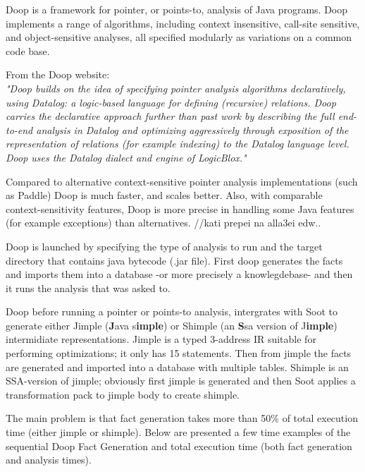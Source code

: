 \documentclass{dithesis}
\begin{document}
    Doop is a framework for pointer, or points-to, analysis of Java programs. Doop implements a range of algorithms, including context insensitive, call-site sensitive, and object-sensitive analyses, all specified modularly as variations on a common code base.

	From the Doop website: \\
    \textit{"Doop builds on the idea of specifying pointer analysis algorithms declaratively, using Datalog: a logic-based language for defining (recursive) relations. Doop carries the declarative approach further than past work by describing the full end-to-end analysis in Datalog and optimizing aggressively through exposition of the representation of relations (for example indexing) to the Datalog language level. Doop uses the Datalog dialect and engine of LogicBlox."}

    Compared to alternative context-sensitive pointer analysis implementations (such as Paddle) Doop is much faster, and scales better. Also, with comparable context-sensitivity features, Doop is more precise in handling some Java features (for example exceptions) than alternatives. //kati prepei na alla3ei edw..

    Doop is launched by specifying the type of analysis to run and the target directory that contains java bytecode (.jar file). First doop generates the facts and imports them into a database -or more precisely a knowlegdebase- and then it runs the analysis that was asked to. \cite{Doop: Framework for Java Pointer Analysis}

        Doop before running a pointer or points-to analysis, intergrates with Soot to generate either Jimple (\textbf{J}ava s\textbf{imple}) or Shimple (an \textbf{S}sa version of J\textbf{imple}) intermidiate representations. Jimple is a typed 3-address IR suitable for performing optimizations; it only has 15 statements. Then from jimple the facts are generated and imported into a database with multiple tables. Shimple is an SSA-version of jimple; obviously first jimple is generated and then Soot applies a transformation pack to jimple body to create shimple.

        The main problem is that fact generation takes more than 50\% of total execution time (either jimple or shimple). Below are presented a few time examples of the sequential Doop Fact Generation and total execution time (both fact generation and analysis times).
\end{document}
